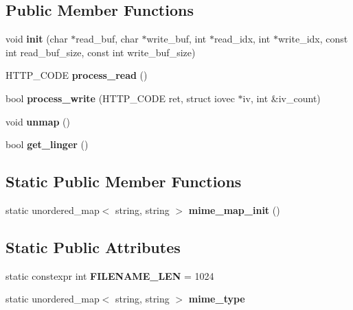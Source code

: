 \subsection*{Public Member Functions}
\begin{DoxyCompactItemize}
\item 
\mbox{\label{classpink__http__machine_a32b0ee47de1b90467d17194fa83b4eb0}} 
void {\bfseries init} (char $\ast$read\+\_\+buf, char $\ast$write\+\_\+buf, int $\ast$read\+\_\+idx, int $\ast$write\+\_\+idx, const int read\+\_\+buf\+\_\+size, const int write\+\_\+buf\+\_\+size)
\item 
\mbox{\label{classpink__http__machine_a7c937bd8da6bdfbf4894e6af9a712d60}} 
H\+T\+T\+P\+\_\+\+C\+O\+DE {\bfseries process\+\_\+read} ()
\item 
\mbox{\label{classpink__http__machine_a7144e4279cd09ab8ce56873bd3906f24}} 
bool {\bfseries process\+\_\+write} (H\+T\+T\+P\+\_\+\+C\+O\+DE ret, struct iovec $\ast$iv, int \&iv\+\_\+count)
\item 
\mbox{\label{classpink__http__machine_a26debab8c361df5c79966f11e2b2dd17}} 
void {\bfseries unmap} ()
\item 
\mbox{\label{classpink__http__machine_a01dcf59a537c21d5a4a92c1c25fbf3ab}} 
bool {\bfseries get\+\_\+linger} ()
\end{DoxyCompactItemize}
\subsection*{Static Public Member Functions}
\begin{DoxyCompactItemize}
\item 
\mbox{\label{classpink__http__machine_ad6d404392628f4b2c94a4b30fefb62f8}} 
static unordered\+\_\+map$<$ string, string $>$ {\bfseries mime\+\_\+map\+\_\+init} ()
\end{DoxyCompactItemize}
\subsection*{Static Public Attributes}
\begin{DoxyCompactItemize}
\item 
\mbox{\label{classpink__http__machine_a33993ee83910b37ae5672c6e6c94cac3}} 
static constexpr int {\bfseries F\+I\+L\+E\+N\+A\+M\+E\+\_\+\+L\+EN} = 1024
\item 
static unordered\+\_\+map$<$ string, string $>$ {\bfseries mime\+\_\+type}
\end{DoxyCompactItemize}



